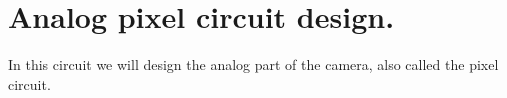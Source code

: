 \section{Analog pixel circuit design.}

In this circuit we will design the analog part of the camera, also called the pixel circuit.
